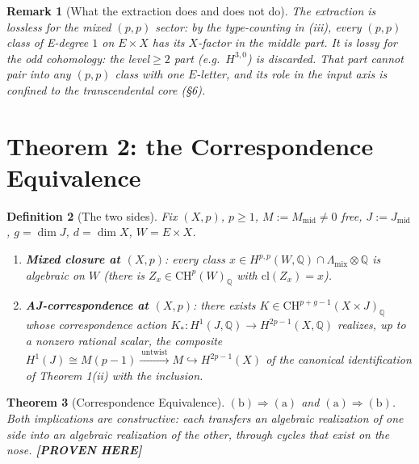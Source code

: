\documentclass[11pt]{article}
\newtheorem{theorem}{Theorem}
\newtheorem{definition}[theorem]{Definition}
\newtheorem{remark}[theorem]{Remark}
\newcommand{\PROVEN}{\textbf{[PROVEN HERE]}}
\newcommand{\Q}{\mathbb{Q}}
\newcommand{\CH}{\mathrm{CH}}
\begin{document}
\begin{remark}[What the extraction does and does not do]
The extraction is lossless for the \emph{mixed} $(p,p)$ sector: by the
type-counting in (iii), every $(p,p)$ class of E-degree $1$ on $E\times X$ has
its $X$-factor in the middle part. It is lossy for the \emph{odd} cohomology:
the level${}\ge{}2$ part (e.g.\ $H^{3,0}$) is discarded. That part cannot pair
into any $(p,p)$ class with one $E$-letter, and its role in the input axis is
confined to the transcendental core (\S6).
\end{remark}

\section{Theorem 2: the Correspondence Equivalence}

\begin{definition}[The two sides]
Fix $(X,p)$, $p\ge1$, $M:=M_{\mathrm{mid}}\ne0$ free, $J:=J_{\mathrm{mid}}$,
$g=\dim J$, $d=\dim X$, $W=E\times X$.
\begin{enumerate}[label=(\alph*)]
\item \textbf{Mixed closure at $(X,p)$}: every class
$x\in H^{p,p}(W,\Q)\cap\Lambda_{\mathrm{mix}}\otimes\Q$
is algebraic on $W$ (there is $Z_x\in\CH^p(W)_\Q$ with
$\mathrm{cl}(Z_x)=x$).
\item \textbf{AJ-correspondence at $(X,p)$}: there exists
$K\in\CH^{p+g-1}(X\times J)_\Q$ whose correspondence action
$K_*\colon H^1(J,\Q)\to H^{2p-1}(X,\Q)$ realizes, up to a nonzero rational
scalar, the composite
$H^1(J)\cong M(p-1)\xrightarrow{\ \text{untwist}\ }M\hookrightarrow H^{2p-1}(X)$
of the canonical identification of Theorem 1(ii) with the inclusion.
\end{enumerate}
\end{definition}

\begin{theorem}[Correspondence Equivalence]\label{thm:corr}
$\mathrm{(b)}\Rightarrow\mathrm{(a)}$ and
$\mathrm{(a)}\Rightarrow\mathrm{(b)}$. Both implications are constructive:
each transfers an algebraic realization of one side into an algebraic
realization of the other, through cycles that exist on the nose.
\PROVEN{}
\end{theorem}
\end{document}
